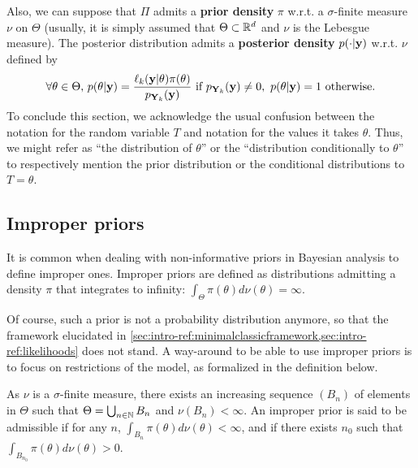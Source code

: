 Also, we can suppose that $\varPi$ admits a \textbf{prior density} $\pi$ w.r.t. a $\sigma$-finite measure $\nu$ on $\Theta$ (usually, it is simply assumed that $\Theta\subset\mathbb{R}^d$ and $\nu$ is the Lebesgue measure). 
The posterior distribution admits a \textbf{posterior density} $p(\cdot|\mathbf{y})$ w.r.t. $\nu$ defined by
    \begin{equation}
        \forall\theta\in\Theta,\, p(\theta|\mathbf{y}) = \frac{\ell_k(\mathbf{y}|\theta)\pi(\theta)}{p_{\mathbf{Y}_k}(\mathbf{y})}\text{\ if\ } p_{\mathbf{Y}_k}(\mathbf{y})\ne0,\ p(\theta|\mathbf{y})=1 \text{\ otherwise}.
    \end{equation}
To conclude this section, we acknowledge the usual confusion between the notation for the random variable $T$ and notation for the values it takes $\theta$. Thus, we might refer as ``the distribution of $\theta$'' or the ``distribution conditionally to $\theta$'' to respectively mention the prior distribution or the conditional distributions to $T=\theta$.


\subsection{Improper priors}\label{sec:intro-ref:improperway-around}

It is common when dealing with non-informative priors in Bayesian analysis to define improper ones.
Improper priors are defined as distributions admitting a density $\pi$ that integrates to infinity: $\int_\Theta\pi(\theta)d\nu(\theta)=\infty$. 

Of course, such a prior is not a probability distribution anymore, so that the framework elucidated in \cref{sec:intro-ref:minimalclassicframework,sec:intro-ref:likelihoods} does not stand. 
A way-around to be able to use improper priors is to focus on restrictions of the model, %
as formalized in the definition below.
\begin{defi}
    As $\nu$ is a $\sigma$-finite measure, there exists an increasing sequence $(B_n)$ of elements in $\Theta$ such that 
$\Theta=\bigcup_{n\in\mathbb{N}}B_n$ and $\nu(B_n) <\infty$.
An improper prior is said to be admissible if for any $n$, $\int_{B_n}\pi(\theta)d\nu(\theta)<\infty$, and if there exists $n_0$ such that $\int_{B_{n_0}}\pi(\theta)d\nu(\theta)>0$.
\end{defi}

